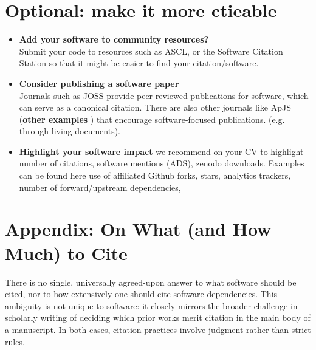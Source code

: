 \documentclass[twocolumn]{openjournal}
\begin{document}
    \section*{Optional: make it more ctieable}
    \begin{itemize}

    \item \textbf{Add your software to community resources?} \\
    Submit your code to resources such as ASCL, or the Software Citation Station so that it might be easier to find your citation/software. %

    \item \textbf{Consider publishing a software paper} \\
    Journals such as JOSS provide peer-reviewed publications for software, which can serve as a canonical citation. There are also other journals like ApJS (\textbf{other examples} ) that encourage software-focused publications. (e.g. through living documents). 


    \item \textbf{Highlight your software impact}
    we recommend on your CV to highlight number of citations, software mentions (ADS), zenodo downloads. 
    Examples can be found here 
    use of affiliated 
    Github forks, stars, 
    analytics trackers,
    number of forward/upstream dependencies,


    \end{itemize}






\section{Appendix: On What (and How Much) to Cite}

There is no single, universally agreed-upon answer to what software should be cited, nor to how extensively one should cite software dependencies. This ambiguity is not unique to software: it closely mirrors the broader challenge in scholarly writing of deciding which prior works merit citation in the main body of a manuscript. In both cases, citation practices involve judgment rather than strict rules.
\end{document}
